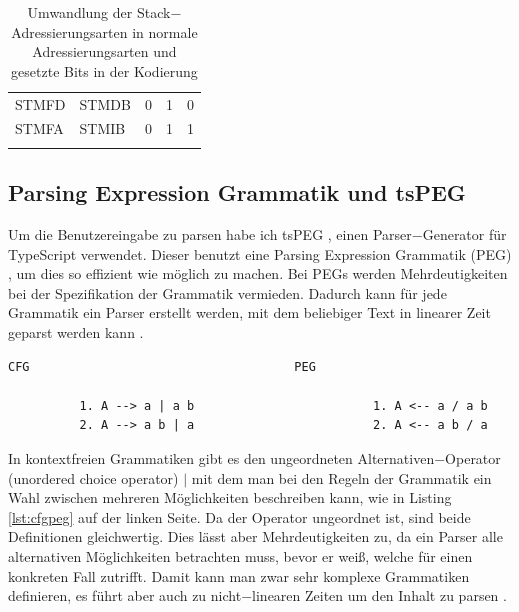 \documentclass[a4paper, 11pt, onecolumn]{article}
\begin{document}
\begin{table}[!htb]
\begin{tabular}{llccc}
STMFD                           & STMDB                              & 0                                    & 1                                    & 0                                    \\ \arrayrulecolor[gray]{.7}\hline
STMFA                           & STMIB                              & 0                                    & 1                                    & 1                                    \\ \arrayrulecolor{black}\hline
\end{tabular}
\caption{Umwandlung der Stack$-$Adressierungsarten in normale Adressierungsarten und gesetzte Bits in der Kodierung \cite{arm:2005}}
\end{table}

\subsection{Parsing Expression Grammatik und tsPEG}\label{sec:peg}

Um die Benutzereingabe zu parsen habe ich tsPEG \cite{tspeg}, einen Parser$-$Generator für TypeScript \cite{typescript} verwendet. Dieser benutzt eine Parsing Expression Grammatik (PEG) \cite{peg}, um dies so effizient wie möglich zu machen. Bei PEGs werden Mehrdeutigkeiten bei der Spezifikation der Grammatik vermieden. Dadurch kann für jede Grammatik ein Parser erstellt werden, mit dem beliebiger Text in linearer Zeit geparst werden kann \cite{peg}.\\

\begin{lstlisting}[basicstyle=\ttfamily\footnotesize, backgroundcolor=\color{backcolour}, caption={Definition einer Grammatik bei kontextfreien Grammatiken (links) und Parsing Expression Grammatiken (rechts) \cite{peg}},captionpos=b, label={lst:cfgpeg}]
                 CFG                                     PEG
             
          1. A --> a | a b                         1. A <-- a / a b
          2. A --> a b | a                         2. A <-- a b / a
\end{lstlisting}

In kontextfreien Grammatiken gibt es den ungeordneten Alternativen$-$Operator (unordered choice operator) $\mid$ mit dem man bei den Regeln der Grammatik ein Wahl zwischen mehreren Möglichkeiten beschreiben kann, wie in Listing \ref{lst:cfgpeg} auf der linken Seite. Da der Operator ungeordnet ist, sind beide Definitionen gleichwertig. Dies lässt aber Mehrdeutigkeiten zu, da ein Parser alle alternativen Möglichkeiten betrachten muss, bevor er weiß, welche für einen konkreten Fall zutrifft. Damit kann man zwar sehr komplexe Grammatiken definieren, es führt aber auch zu nicht$-$linearen Zeiten um den Inhalt zu parsen \cite{cfg}.
\end{document}
